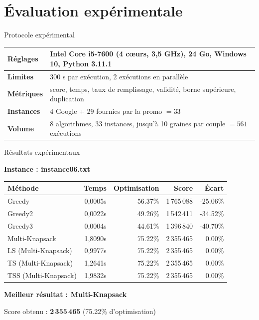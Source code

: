 \documentclass[aspectratio=169,xcolor=table]{pres}
\begin{document}
\section{Évaluation expérimentale}

\begin{frame}{Protocole expérimental}
  \centering
  \small
  \begin{tabular}{|l|p{8.7cm}|}
    \hline
    \rowcolor{accent!15} \textbf{Réglages} & Intel Core i5-7600 (4 c\oe urs, 3,5 GHz), 24 Go, Windows 10, Python 3.11.1 \\ \hline
    \textbf{Limites}  & 300 s par exécution, 2 exécutions en parallèle \\ \hline
    \textbf{Métriques} & score, temps, taux de remplissage, validité, borne supérieure, duplication \\ \hline
    \textbf{Instances} & 4 Google + 29 fournies par la promo $= 33$ \\ \hline
    \textbf{Volume} & 8 algorithmes, 33 instances, jusqu'à 10 graines par couple $= 561$ exécutions \\ \hline
  \end{tabular}
\end{frame}

\begin{frame}{Résultats expérimentaux}

  \vfill
  \centering

  \textbf{Instance : instance06.txt}

  \vspace{0.5cm}

  \begin{tabular}{|l|r|r|r|r|}
      \hline
      \textbf{Méthode} & \textbf{Temps} & \textbf{Optimisation} & \textbf{Score} & \textbf{Écart} \\
      \hline
      Greedy & 0,0005s & 56.37\% & 1\,765\,088 & -25.06\% \\
      Greedy2 & 0,0022s & 49.26\% & 1\,542\,411 & -34.52\% \\
      Greedy3 & 0,0004s & 44.61\% & 1\,396\,840 & -40.70\% \\
      \hline
      Multi-Knapsack & 1,8090s & 75.22\% & 2\,355\,465 & 0.00\% \\
      LS (Multi-Knapsack) & 0,9977s& 75.22\% & 2\,355\,465 & 0.00\% \\
      TS (Multi-Knapsack) & 1,2641s& 75.22\% & 2\,355\,465 & 0.00\% \\
      TSS (Multi-Knapsack) & 1,9832s & 75.22\% & 2\,355\,465 & 0.00\% \\
      \hline
  \end{tabular}

  \vspace{0.4cm}

  \textbf{Meilleur résultat : Multi-Knapsack}

  \vspace{0.2cm}

  Score obtenu : \textbf{2\,355\,465} (75.22\% d'optimisation)

  \vfill

\end{frame}
\end{document}
